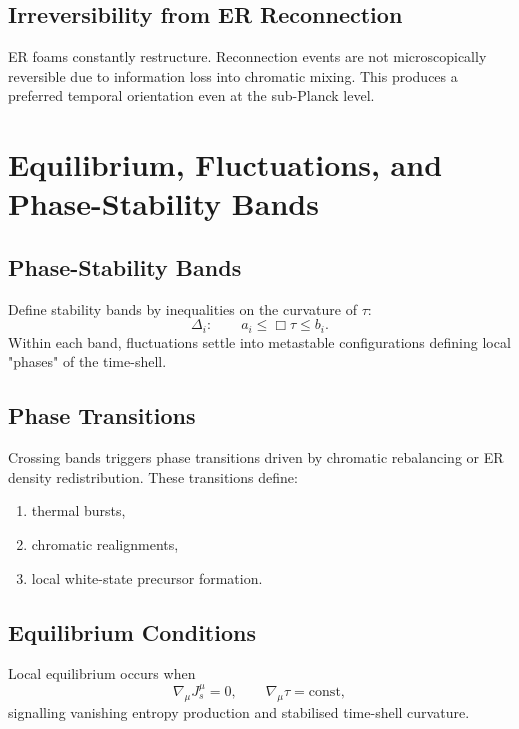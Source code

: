 \section{Irreversibility from ER Reconnection}

ER foams constantly restructure.
Reconnection events are not microscopically reversible due to information loss into chromatic mixing.
This produces a preferred temporal orientation even at the sub-Planck level.

\chapter{Equilibrium, Fluctuations, and Phase-Stability Bands}

\section{Phase-Stability Bands}

Define stability bands by inequalities on the curvature of $\tau$:
\[
\Delta_i: \qquad a_i \le \Box \tau \le b_i.
\]
Within each band, fluctuations settle into metastable configurations defining local "phases" of the time-shell.

\section{Phase Transitions}

Crossing bands triggers phase transitions driven by chromatic rebalancing or ER density redistribution.
These transitions define:
\begin{enumerate}
\item thermal bursts,
\item chromatic realignments,
\item local white-state precursor formation.
\end{enumerate}

\section{Equilibrium Conditions}

Local equilibrium occurs when
\[
\nabla_\mu J^\mu_s = 0,\qquad \nabla_\mu \tau = \mathrm{const},
\]
signalling vanishing entropy production and stabilised time-shell curvature.

